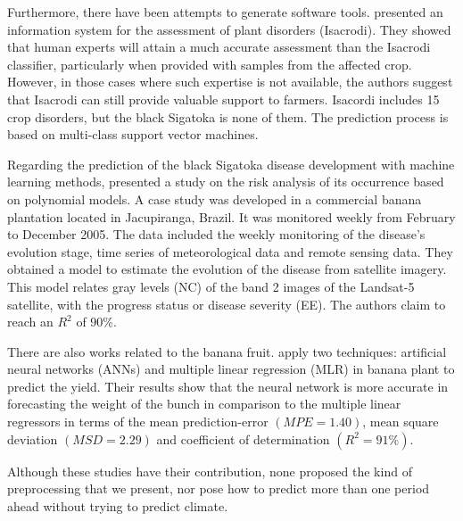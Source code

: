 Furthermore, there have been attempts to generate software
tools. \citet{Camargo2012} presented an information
system for the assessment of plant disorders (Isacrodi).
%
They showed that human experts will attain a much accurate assessment
than the Isacrodi classifier, particularly when provided with samples
from the affected crop. However, in those cases where such expertise
is not available, the authors suggest that Isacrodi can still provide
valuable support to farmers.
%
Isacordi includes 15 crop disorders, but the black Sigatoka is none
of them. The prediction process is based on multi-class support vector
machines.

Regarding the prediction of the black Sigatoka disease development
with machine learning methods, \citet{Bendini2013} presented a study
on the risk analysis of its occurrence based on polynomial models.
%
A case study was developed in a commercial banana plantation located
in Jacupiranga, Brazil. It was monitored weekly from February to
December 2005.
%
The data included the weekly monitoring of the disease’s evolution
stage, time series of meteorological data and remote sensing
data.
%
They obtained a model to estimate the evolution of the disease from
satellite imagery. This model relates gray levels (NC) of the band 2
images of the Landsat-5 satellite, with the progress status or disease
severity (EE). The authors claim to reach an $R^2$ of 90\%.

There are also works related to the banana fruit. \citet{Soares2014}
apply two techniques: artificial neural networks (ANNs) and multiple
linear regression (MLR) in banana plant to predict the yield.
%
Their results show that the neural network is more accurate in
forecasting the weight of the bunch in comparison to the multiple
linear regressors in terms of the mean prediction-error $(MPE =
1.40)$, mean square deviation $(MSD = 2.29)$ and coefficient of
determination $(R^2 = 91\%)$.

Although these studies have their contribution, none proposed the kind of preprocessing that we present, nor pose how to predict more than one period ahead without trying to predict climate.

%

